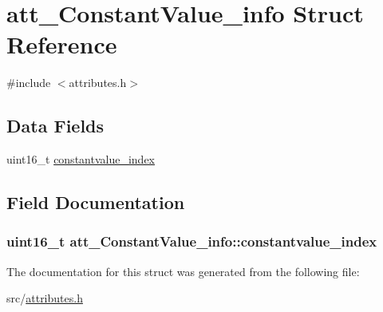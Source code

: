 \hypertarget{structatt__ConstantValue__info}{}\section{att\+\_\+\+Constant\+Value\+\_\+info Struct Reference}
\label{structatt__ConstantValue__info}


{\ttfamily \#include $<$attributes.\+h$>$}

\subsection*{Data Fields}
\begin{DoxyCompactItemize}
\item 
uint16\+\_\+t \hyperlink{structatt__ConstantValue__info_a6d9c6fc03274f8dc77c2ea8c53744dfa}{constantvalue\+\_\+index}
\end{DoxyCompactItemize}


\subsection{Field Documentation}
\subsubsection[{\texorpdfstring{constantvalue\+\_\+index}{constantvalue_index}}]{\setlength{\rightskip}{0pt plus 5cm}uint16\+\_\+t att\+\_\+\+Constant\+Value\+\_\+info\+::constantvalue\+\_\+index}\hypertarget{structatt__ConstantValue__info_a6d9c6fc03274f8dc77c2ea8c53744dfa}{}\label{structatt__ConstantValue__info_a6d9c6fc03274f8dc77c2ea8c53744dfa}


The documentation for this struct was generated from the following file\+:\begin{DoxyCompactItemize}
\item 
src/\hyperlink{attributes_8h}{attributes.\+h}\end{DoxyCompactItemize}
